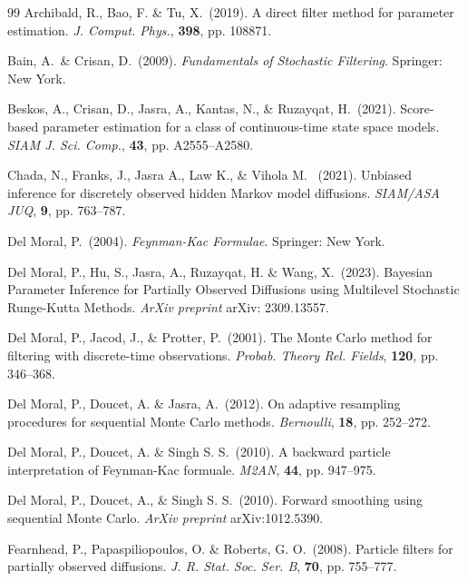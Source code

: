 \documentclass[english]{article}
\begin{document}
\begin{thebibliography}{99}
{\sc Archibald, R., Bao, F. \& Tu, X.}~(2019). A direct filter method for parameter estimation. \emph{J. Comput. Phys.}, {\bf 398}, pp. 108871.

{\sc Bain}, A.~\& {\sc Crisan}, D.~(2009). \emph{Fundamentals of Stochastic Filtering}. Springer: New York.



{\sc Beskos}, A., {\sc Crisan}, D., {\sc Jasra}, A., {\sc Kantas}, N., \& {\sc Ruzayqat}, H.~(2021). 
Score-based parameter estimation for a class of continuous-time state space models.
\emph{SIAM J. Sci. Comp.}, {\bf 43}, pp. A2555--A2580.

{\sc Chada}, N.,  {\sc Franks}, J.,  {\sc Jasra} A.,  {\sc Law} K.,  \& {\sc Vihola} M. ~(2021).
Unbiased inference for discretely observed hidden Markov model diffusions. \emph{SIAM/ASA JUQ}, {\bf 9}, pp. 763--787.

{\sc Del Moral}, P.~(2004). \emph{Feynman-Kac Formulae}. Springer: New York.

{\sc Del Moral, P., Hu, S., Jasra, A.,  Ruzayqat, H. \& Wang, X.}~(2023). Bayesian Parameter Inference for Partially Observed Diffusions using Multilevel Stochastic Runge-Kutta Methods. \emph{ArXiv preprint} arXiv: 2309.13557.

{\sc Del Moral}, P., {\sc Jacod}, J., \& {\sc Protter}, P.~(2001). The Monte Carlo method for filtering with discrete-time observations. \emph{Probab. Theory Rel. Fields}, {\bf 120}, pp. 346--368.

{\sc Del Moral}, P., {\sc Doucet}, A. \& {\sc Jasra}, A.~(2012).
On adaptive resampling procedures for sequential Monte Carlo methods. {\it Bernoulli}, {\bf 18}, pp. 252--272.

{\sc Del Moral}, P., {\sc Doucet}, A. \& {\sc Singh} S. S.~(2010). A backward particle interpretation
of Feynman-Kac formuale. \emph{M2AN}, {\bf 44}, pp. 947--975.


{\sc Del Moral, P., Doucet, A., \& Singh S. S.}~(2010). Forward smoothing using sequential Monte Carlo. \emph{ArXiv preprint} arXiv:1012.5390.

{\sc Fearnhead}, P., 
{\sc Papaspiliopoulos}, O. \& {\sc Roberts}, G. O.~(2008). 
Particle filters for partially observed diffusions. \emph{J. R. Stat. Soc. Ser. B}, {\bf 70}, pp. 755--777.


\end{thebibliography}
\end{document}
